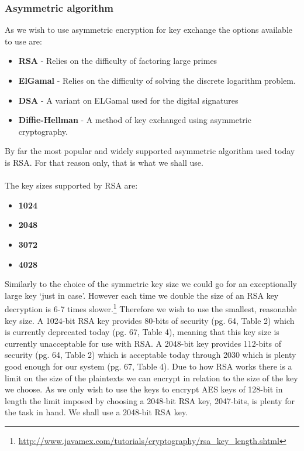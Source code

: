 \documentclass[12pt, titlepage]{article}
\begin{document}
\subsubsection{Asymmetric algorithm}
As we wish to use asymmetric encryption for key exchange the options available to use are:
\begin{itemize}
	\item \textbf{RSA} - Relies on the difficulty of factoring large primes
	\item \textbf{ElGamal} - Relies on the difficulty of solving the discrete logarithm problem.
	\item \textbf{DSA} - A variant on ELGamal used for the digital signatures
	\item \textbf{Diffie-Hellman} - A method of key exchanged using asymmetric cryptography.
\end{itemize}
By far the most popular and widely supported asymmetric algorithm used today is RSA. For that reason only, that is what we shall use.
\\
\\
The key sizes supported by RSA are:
\begin{itemize}
	\item \textbf{1024}
	\item \textbf{2048}
	\item \textbf{3072}
	\item \textbf{4028}
\end{itemize}
Similarly to the choice of the symmetric key size we could go for an exceptionally large key `just in case'. However each time we double the size of an RSA key decryption is 6-7 times slower.\footnote{\url{http://www.javamex.com/tutorials/cryptography/rsa_key_length.shtml}}
Therefore we wish to use the smallest, reasonable key size. A 1024-bit RSA key provides 80-bits of security (pg. 64, Table 2) which is currently deprecated today (pg. 67, Table 4), meaning that this key size is currently unacceptable for use with RSA. A 2048-bit key provides 112-bits of security (pg. 64, Table 2) which is acceptable today through 2030 which is plenty good enough for our system (pg. 67, Table 4).\cite{nistKeys}
\newline \indent Due to how RSA works there is a limit on the size of the plaintexts we can encrypt in relation to the size of the key we choose. As we only wish to use the keys to encrypt AES keys of 128-bit in length the limit imposed by choosing a 2048-bit RSA key, 2047-bits, is plenty for the task in hand.
\newline We shall use a 2048-bit RSA key.
\end{document}
